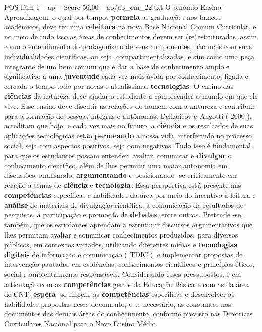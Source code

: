 \begin{textsample}{POS Dim 1 – ap – Score 56.00 – ap/ap\_em\_22.txt}
O binômio Ensino-Aprendizagem, o qual por tempos \textbf{permeia} as graduações nos bancos acadêmicos, deve ter uma \textbf{releitura} na nova Base Nacional Comum Curricular, e no meio de tudo isso as áreas de conhecimentos devem ser (re)estruturadas, assim como o entendimento do protagonismo de seus componentes, não mais com suas individualidades científicas, ou seja, compartimentalizadas, e sim como uma peça integrante de um bem comum que é dar a base de conhecimento amplo e significativo a uma \textbf{juventude} cada vez mais ávida por conhecimento, ligada e cercada o tempo todo por novas e atualíssimas \textbf{tecnologias}.
O ensino das \textbf{ciências} da natureza deve ajudar o estudante a compreender o mundo em que ele vive.
Esse ensino deve discutir as relações do homem com a natureza e contribuir para a formação de pessoas íntegras e autônomas.
Delizoicov e Angotti ( 2000 ), acreditam que hoje, e cada vez mais no futuro, a \textbf{ciência} e os resultados de suas aplicações tecnológicas estão \textbf{permeando} a nossa vida, interferindo no processo social, seja com aspectos positivos, seja com negativos.
Tudo isso é fundamental para que os estudantes possam entender, avaliar, comunicar e \textbf{divulgar} o conhecimento científico, além de lhes permitir uma maior autonomia em discussões, analisando, \textbf{argumentando} e posicionando -se criticamente em relação a temas de \textbf{ciência} e \textbf{tecnologia}.
Essa perspectiva está presente nas \textbf{competências} específicas e habilidades da área por meio do incentivo à leitura e \textbf{análise} de materiais de divulgação científica, à comunicação de resultados de pesquisas, à participação e promoção de \textbf{debates}, entre outros.
Pretende -se, também, que os estudantes aprendam a estruturar discursos argumentativos que lhes permitam avaliar e comunicar conhecimentos produzidos, para diversos públicos, em contextos variados, utilizando diferentes mídias e \textbf{tecnologias} \textbf{digitais} de informação e comunicação ( TDIC ), e implementar propostas de intervenção pautadas em evidências, conhecimentos científicos e princípios éticos, social e ambientalmente responsáveis.
Considerando esses pressupostos, e em articulação com as \textbf{competências} gerais da Educação Básica e com as da área de CNT, \textbf{espera} -se impelir as \textbf{competências} específicas e desenvolver as habilidades propostas nesse documento, e se necessário, as constantes nos documentos das demais áreas do conhecimento, conforme previsto nas Diretrizes Curriculares Nacional para o Novo Ensino Médio.

\end{textsample}

